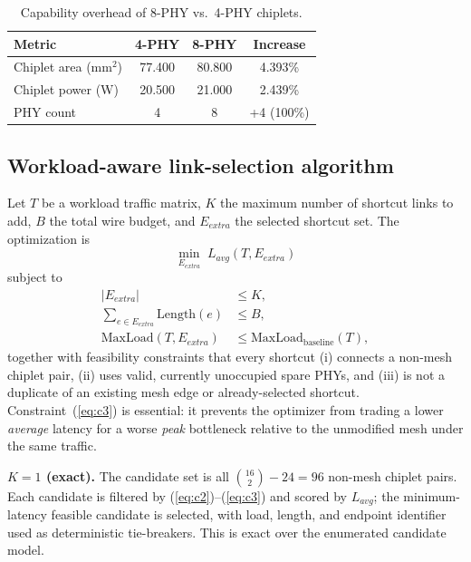 \documentclass[conference]{IEEEtran}
\begin{document}
\begin{table}[t]
\centering
\caption{Capability overhead of 8-PHY vs.\ 4-PHY chiplets.}
\label{tab:phy-overhead}
\begin{tabular}{lccc}
\toprule
Metric & 4-PHY & 8-PHY & Increase \\
\midrule
Chiplet area (mm$^2$) & 77.400 & 80.800 & 4.393\% \\
Chiplet power (W) & 20.500 & 21.000 & 2.439\% \\
PHY count & 4 & 8 & +4 (100\%) \\
\bottomrule
\end{tabular}
\end{table}

\subsection{Workload-aware link-selection algorithm}
Let $T$ be a workload traffic matrix, $K$ the maximum number of shortcut links to add, $B$ the total wire budget, and $E_{extra}$ the selected shortcut set. The optimization is
\begin{equation}
\min_{E_{extra}} \; L_{avg}(T, E_{extra})
\end{equation}
subject to
\begin{align}
|E_{extra}| &\le K, \label{eq:c1}\\
\sum_{e \in E_{extra}} \mathrm{Length}(e) &\le B, \label{eq:c2}\\
\mathrm{MaxLoad}(T, E_{extra}) &\le \mathrm{MaxLoad}_{\text{baseline}}(T), \label{eq:c3}
\end{align}
together with feasibility constraints that every shortcut (i) connects a non-mesh chiplet pair, (ii) uses valid, currently unoccupied spare PHYs, and (iii) is not a duplicate of an existing mesh edge or already-selected shortcut. Constraint~(\ref{eq:c3}) is essential: it prevents the optimizer from trading a lower \emph{average} latency for a worse \emph{peak} bottleneck relative to the unmodified mesh under the same traffic.

\textbf{$K{=}1$ (exact).} The candidate set is all $\binom{16}{2} - 24 = 96$ non-mesh chiplet pairs. Each candidate is filtered by (\ref{eq:c2})--(\ref{eq:c3}) and scored by $L_{avg}$; the minimum-latency feasible candidate is selected, with load, length, and endpoint identifier used as deterministic tie-breakers. This is exact over the enumerated candidate model.
\end{document}
